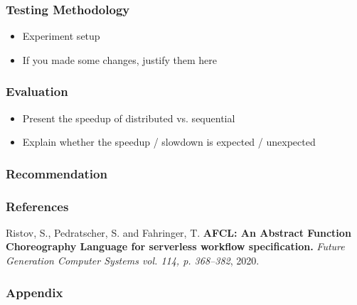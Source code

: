 \documentclass[11pt,t,usepdftitle=false,aspectratio=169]{beamer}
\begin{document}
\begin{frame}
\frametitle{Testing Methodology}
    \begin{itemize}
        \item Experiment setup
        \item If you made some changes, justify them here
    \end{itemize}
\end{frame}

\begin{frame}
\frametitle{Evaluation}
    \begin{itemize}
        \item Present the speedup of distributed vs. sequential
        \item Explain whether the speedup / slowdown is expected / unexpected
    \end{itemize}
\end{frame}

\begin{frame}
\frametitle{Recommendation}
\end{frame}




\begingroup

{\footnotesize
\begin{frame}
	\frametitle{References}
	\begin{minipage}[t]{1\textwidth}

      \begin{thebibliography}{9}

        \bibliofont

		Ristov, S., Pedratscher, S. and Fahringer, T.
		\textbf{AFCL: An Abstract Function Choreography Language for serverless workflow specification.}
		\textit{Future Generation Computer Systems vol. 114, p. 368--382}, 2020.

	  \end{thebibliography}
      \vspace{1cm}
   \end{minipage}
\end{frame}
}

\begin{frame}
    \frametitle{Appendix}

\end{frame}
\endgroup
\end{document}
